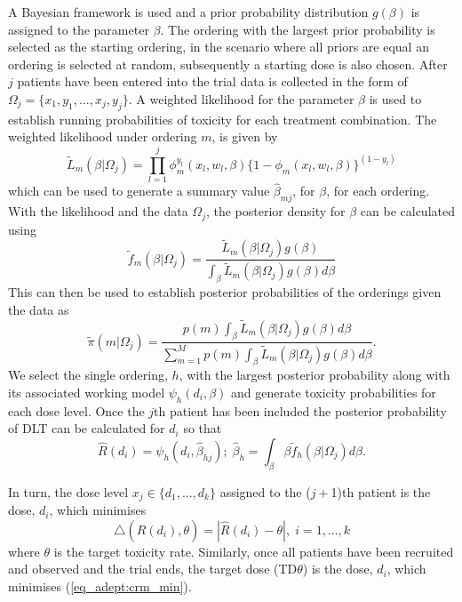 A Bayesian framework is used and a prior probability distribution $g(\beta)$ is assigned to the parameter $\beta$. The ordering with the largest prior probability is selected as the starting ordering, in the scenario where all priors are equal an ordering is selected at random, subsequently a starting dose is also chosen. After $j$ patients have been entered into the trial data is collected in the form of $\Omega_j = \{x_1,y_1, ..., x_j,y_j\}$. A weighted likelihood for the parameter $\beta$ is used to establish running probabilities of toxicity for each treatment combination. The weighted likelihood under ordering $m$, is given by 
\begin{equation}
\label{Adept_likelihood_equation}
\tilde{L}_m(\beta|\Omega_j)=\prod_{l=1}^{j}\phi_m^{y_l}(x_l,w_l,\beta)\{1-\phi_m(x_l,w_l,\beta)\}^{(1-y_l)}
\end{equation} 
which can be used to generate a summary value $\hat{\beta}_{mj}$, for $\beta$, for each ordering. With the likelihood and the data $\Omega_j$, the posterior density for $\beta$ can be calculated using 
\begin{equation}
	\tilde{f}_m(\beta|\Omega_j)=\frac{\tilde{L}_m(\beta|\Omega_j)g(\beta)}{\int_{\beta}\tilde{L}_m(\beta|\Omega_j)g(\beta)d\beta}
\end{equation}
This can then be used to establish posterior probabilities of the orderings given the data as 
\begin{equation}
\tilde{\pi}(m|\Omega_j)=\frac{p(m)\int_{\beta}\tilde{L}_m(\beta|\Omega_j)g(\beta)d\beta}{\sum_{m=1}^{M}p(m)\int_{\beta}\tilde{L}_m(\beta|\Omega_j)g(\beta)d\beta}.
\end{equation}
We select the single ordering, $h$, with the largest posterior probability along with its associated working model $\psi_h(d_i,\beta)$ and generate toxicity probabilities for each dose level. Once the $j$th patient has been included the posterior probability of DLT can be calculated for $d_{i}$ so that
\begin{equation}
	\hat{R}(d_i) = \psi_h(d_i,\hat{\beta}_{hj}); \; \hat{\beta}_h = \int_{\beta}\beta\tilde{f}_h(\beta|\Omega_j)d\beta.
\end{equation}

In turn, the dose level $x_j \in \{d_1,...,d_k\}$ assigned to the ($j+$1)th patient is the dose, $d_i$, which minimises 
\begin{equation}
\label{eq_adept:crm_min}
	\triangle(\hat{R}(d_i),\theta) = |\hat{R}(d_i)-\theta|, \; i=1,...,k
\end{equation}
where $\theta$ is the target toxicity rate. Similarly, once all patients have been recruited and observed and the trial ends, the target dose (TD$\theta$) is the dose, $d_{i}$, which minimises (\ref{eq_adept:crm_min}).

